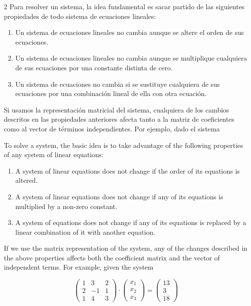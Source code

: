 \begin{paracol}{2}
Para resolver un sistema, la idea fundamental es sacar partido de las siguientes propiedades de todo sistema de ecuaciones lineales:
\begin{enumerate}
\item Un sistema de ecuaciones lineales no cambia aunque se altere el orden de sus ecuaciones.
\item Un sistema de ecuaciones lineales no cambia aunque se multiplique cualquiera de sus ecuaciones por una constante distinta de cero.
\item Un sistema de ecuaciones no cambia si se sustituye cualquiera de sus ecuaciones por una combinación lineal de ella con otra ecuación.
\end{enumerate}

Si usamos la representación matricial del sistema, cualquiera de los cambios descritos en las propiedades anteriores afecta tanto a la matriz de coeficientes como al vector de términos independientes. Por ejemplo, dado el sistema

\switchcolumn

To solve a system, the basic idea is to take advantage of the following properties of any system of linear equations:
\begin{enumerate}
\item A system of linear equations does not change if the order of its equations is altered.
\item A system of linear equations does not change if any of its equations is multiplied by a non-zero constant.
\item A system of equations does not change if any of its equations is replaced by a linear combination of it with another equation.
\end{enumerate}

If we use the matrix representation of the system, any of the changes described in the above properties affects both the coefficient matrix and the vector of independent terms. For example, given the system
\end{paracol}

\begin{equation*}
\begin{pmatrix}
1& 3& 2\\
2& -1& 1\\
1& 4& 3
\end{pmatrix}\cdot \begin{pmatrix}
x_1\\
x_2\\
x_3
\end{pmatrix}=\begin{pmatrix}
13\\
3\\
18
\end{pmatrix}
\end{equation*}

